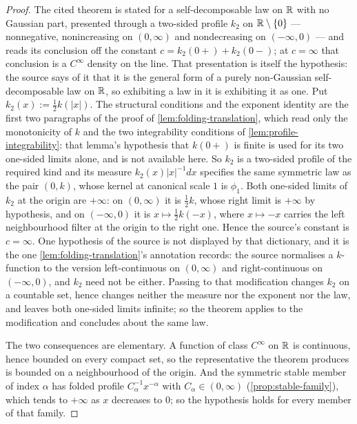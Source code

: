 \begin{proof}
The cited theorem is stated for a self-decomposable law on $\mathbb{R}$ with no Gaussian part, presented
through a two-sided profile $k_2$ on $\mathbb{R} \setminus \{0\}$ --- nonnegative, nonincreasing on
$(0,\infty)$ and nondecreasing on $(-\infty,0)$ --- and reads its conclusion off the constant
$c = k_2(0{+}) + k_2(0{-})$; at $c = \infty$ that conclusion is a $C^\infty$ density on the line.
That presentation is itself the hypothesis: the source says of it that it is the general form of a
purely non-Gaussian self-decomposable law on $\mathbb{R}$, so exhibiting a law in it is exhibiting it as
one.
Put $k_2(x) := \tfrac12 k(|x|)$. The structural conditions and the exponent identity are the first
two paragraphs of the proof of \ref{lem:folding-translation}, which read only the monotonicity of
$k$ and the two integrability conditions of \ref{lem:profile-integrability}: that lemma's
hypothesis that $k(0{+})$ is finite is used for its two one-sided limits alone, and is not
available here. So $k_2$ is a two-sided profile of the required kind and its \Levy{} measure
$k_2(x)|x|^{-1}dx$ specifies the same symmetric law as the pair $(0,k)$, whose kernel at canonical
scale $1$ is $\phi_1$. Both one-sided limits of $k_2$ at the origin are $+\infty$: on $(0,\infty)$
it is $\tfrac12 k$, whose right limit is $+\infty$ by hypothesis, and on $(-\infty,0)$ it is
$x \mapsto \tfrac12 k(-x)$, where $x \mapsto -x$ carries the left neighbourhood filter at the
origin to the right one. Hence the source's constant is $c = \infty$. One hypothesis of the source
is not displayed by that dictionary, and it is the one \ref{lem:folding-translation}'s annotation
records: the source normalises a $k$-function to the version left-continuous on $(0,\infty)$ and
right-continuous on $(-\infty,0)$, and $k_2$ need not be either. Passing to that modification
changes $k_2$ on a countable set, hence changes neither the \Levy{} measure nor the exponent nor
the law, and leaves both one-sided limits infinite; so the theorem applies to the modification and
concludes about the same law.

The two consequences are elementary. A function of class $C^\infty$ on $\mathbb{R}$ is continuous, hence
bounded on every compact set, so the representative the theorem produces is bounded on a
neighbourhood of the origin. And the symmetric stable member of index $\alpha$ has folded profile
$C_\alpha^{-1}x^{-\alpha}$ with $C_\alpha \in (0,\infty)$ (\ref{prop:stable-family}), which tends
to $+\infty$ as $x$ decreases to $0$; so the hypothesis holds for every member of that family.
\end{proof}
